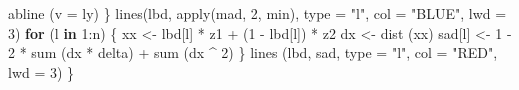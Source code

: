 \documentclass[
  12pt,
]{book}
\newenvironment{Shaded}{\begin{snugshade}}{\end{snugshade}}
\newcommand{\AttributeTok}[1]{\textcolor[rgb]{0.77,0.63,0.00}{#1}}
\newcommand{\ControlFlowTok}[1]{\textcolor[rgb]{0.13,0.29,0.53}{\textbf{#1}}}
\newcommand{\DecValTok}[1]{\textcolor[rgb]{0.00,0.00,0.81}{#1}}
\newcommand{\FunctionTok}[1]{\textcolor[rgb]{0.00,0.00,0.00}{#1}}
\newcommand{\NormalTok}[1]{#1}
\newcommand{\OtherTok}[1]{\textcolor[rgb]{0.56,0.35,0.01}{#1}}
\newcommand{\SpecialCharTok}[1]{\textcolor[rgb]{0.00,0.00,0.00}{#1}}
\newcommand{\StringTok}[1]{\textcolor[rgb]{0.31,0.60,0.02}{#1}}
\theoremstyle{definition}
\theoremstyle{definition}
\theoremstyle{definition}
\theoremstyle{definition}
\theoremstyle{remark}
\begin{document}
\begin{Shaded}
\begin{Highlighting}[]
    \FunctionTok{abline}\NormalTok{ (}\AttributeTok{v =}\NormalTok{ ly)}
\NormalTok{  \}}
  \FunctionTok{lines}\NormalTok{(lbd,}
        \FunctionTok{apply}\NormalTok{(mad, }\DecValTok{2}\NormalTok{, min),}
        \AttributeTok{type =} \StringTok{"l"}\NormalTok{,}
        \AttributeTok{col =} \StringTok{"BLUE"}\NormalTok{,}
        \AttributeTok{lwd =} \DecValTok{3}\NormalTok{)}
  \ControlFlowTok{for}\NormalTok{ (l }\ControlFlowTok{in} \DecValTok{1}\SpecialCharTok{:}\NormalTok{n) \{}
\NormalTok{    xx }\OtherTok{\textless{}{-}}\NormalTok{ lbd[l] }\SpecialCharTok{*}\NormalTok{ z1 }\SpecialCharTok{+}\NormalTok{ (}\DecValTok{1} \SpecialCharTok{{-}}\NormalTok{ lbd[l]) }\SpecialCharTok{*}\NormalTok{ z2}
\NormalTok{    dx }\OtherTok{\textless{}{-}} \FunctionTok{dist}\NormalTok{ (xx)}
\NormalTok{    sad[l] }\OtherTok{\textless{}{-}} \DecValTok{1} \SpecialCharTok{{-}} \DecValTok{2} \SpecialCharTok{*} \FunctionTok{sum}\NormalTok{ (dx }\SpecialCharTok{*}\NormalTok{ delta) }\SpecialCharTok{+} \FunctionTok{sum}\NormalTok{ (dx }\SpecialCharTok{\^{}} \DecValTok{2}\NormalTok{)}
\NormalTok{  \}}
  \FunctionTok{lines}\NormalTok{ (lbd,}
\NormalTok{         sad,}
         \AttributeTok{type =} \StringTok{"l"}\NormalTok{,}
         \AttributeTok{col =} \StringTok{"RED"}\NormalTok{,}
         \AttributeTok{lwd =} \DecValTok{3}\NormalTok{)}
\NormalTok{\}}


\end{Highlighting}
\end{Shaded}
\end{document}
